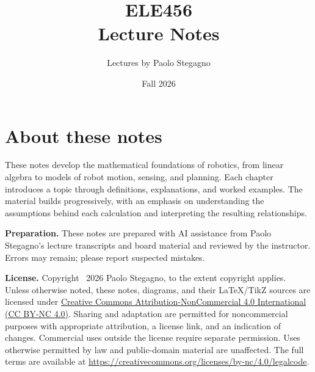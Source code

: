 \documentclass[11pt,letterpaper,oneside]{report}
\title{ELE456\\Lecture Notes}
\author{Lectures by Paolo Stegagno}
\date{Fall 2026}
\begin{document}
\hypersetup{pageanchor=false}
\maketitle
{}
\hypersetup{pageanchor=true}
\chapter*{About these notes}
These notes develop the mathematical foundations of robotics, from linear
algebra to models of robot motion, sensing, and planning. Each chapter introduces
a topic through definitions, explanations, and worked examples. The material
builds progressively, with an emphasis on understanding the assumptions behind
each calculation and interpreting the resulting relationships.

\medskip
\textbf{Preparation.} These notes are prepared with AI assistance from
Paolo Stegagno's lecture transcripts and board material and reviewed by the
instructor. Errors may remain; please report suspected mistakes.

\medskip
\textbf{License.} Copyright \textcopyright\ 2026 Paolo Stegagno, to the extent
copyright applies. Unless otherwise noted, these notes, diagrams, and their
LaTeX/TikZ sources are licensed under
\href{https://creativecommons.org/licenses/by-nc/4.0/}{Creative Commons
Attribution-NonCommercial 4.0 International (CC BY-NC 4.0)}.
Sharing and adaptation are permitted for noncommercial purposes with
appropriate attribution, a license link, and an indication of changes.
Commercial uses outside the license require separate permission.
Uses otherwise permitted by law and public-domain material are unaffected.
The full terms are available at
\url{https://creativecommons.org/licenses/by-nc/4.0/legalcode}.
\tableofcontents
\clearpage
{}














\appendix

\end{document}
